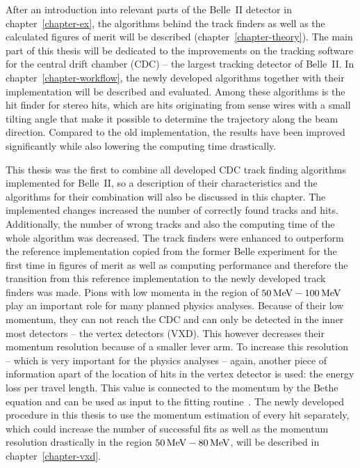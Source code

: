 After an introduction into relevant parts of the Belle~II detector in chapter~\ref{chapter-ex}, the algorithms behind the track finders as well as the calculated figures of merit will be described (chapter~\ref{chapter-theory}). The main part of this thesis will be dedicated to the improvements on the tracking software for the central drift chamber (CDC) -- the largest tracking detector of Belle~II. In chapter~\ref{chapter-workflow}, the newly developed algorithms together with their implementation will be described and evaluated. Among these algorithms is the hit finder for stereo hits, which are hits originating from sense wires with a small tilting angle that make it possible to determine the trajectory along the beam direction. Compared to the old implementation, the results have been improved significantly while also lowering the computing time drastically.

This thesis was the first to combine all developed CDC track finding algorithms implemented for Belle~II, so a description of their characteristics and the algorithms for their combination will also be discussed in this chapter. The implemented changes increased the number of correctly found tracks and hits. Additionally, the number of wrong tracks and also the computing time of the whole algorithm was decreased. The track finders were enhanced to outperform the reference implementation copied from the former Belle experiment for the first time in figures of merit as well as computing performance and therefore the transition from this reference implementation to the newly developed track finders was made.
\clearpage
Pions with low momenta in the region of $\unit[50]{MeV} - \unit[100]{MeV}$ play an important role for many planned physics analyses. Because of their low momentum, they can not reach the CDC and can only be detected in the inner most detectors -- the vertex detectors (VXD). This however decreases their momentum resolution because of a smaller lever arm. To increase this resolution -- which is very important for the physics analyses -- again, another piece of information apart of the location of hits in the vertex detector is used: the energy loss per travel length. This value is connected to the momentum by the Bethe equation and can be used as input to the fitting routine~\cite{robert}. The newly developed procedure in this thesis to use the momentum estimation of every hit separately, which could increase the number of successful fits as well as the momentum resolution drastically in the region $\unit[50]{MeV} - \unit[80]{MeV}$, will be described in chapter~\ref{chapter-vxd}.

